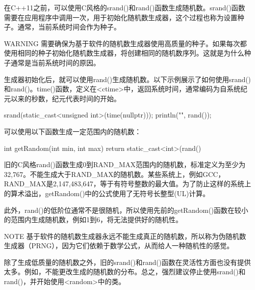 在C++11之前，可以使用C风格的srand()和rand()函数生成随机数。srand()函数需要在应用程序中调用一次，用于初始化随机数生成器，这个过程也称为设置种子。通常，当前系统时间会作为种子。

\begin{myWarning}{WARNING}
需要确保为基于软件的随机数生成器使用高质量的种子。如果每次都使用相同的种子初始化随机数生成器，将创建相同的随机数序列。这就是为什么种子通常是当前系统时间的原因。
\end{myWarning}

生成器初始化后，就可以使用rand()生成随机数。以下示例展示了如何使用srand()和rand()。time()函数，定义在<ctime>中，返回系统时间，通常编码为自系统纪元以来的秒数，纪元代表时间的开始。

\begin{cpp}
srand(static_cast<unsigned int>(time(nullptr)));
println("{}", rand());
\end{cpp}

可以使用以下函数生成一定范围内的随机数：

\begin{cpp}
int getRandom(int min, int max)
{
    return static_cast<int>(rand() %
}
\end{cpp}

旧的C风格rand()函数生成0到RAND\_MAX范围内的随机数，标准定义为至少为32,767。不能生成大于RAND\_MAX的随机数。某些系统上，例如GCC，RAND\_MAX是2,147,483,647，等于有符号整数的最大值。为了防止这样的系统上的算术溢出，getRandom()中的公式使用了无符号长整型(UL)计算。

此外，rand()的低阶位通常不是很随机，所以使用先前的getRandom()函数在较小的范围内生成随机数，例如1到6，将无法提供好的随机性。

\begin{myNotic}{NOTE}
基于软件的随机数生成器永远不能生成真正的随机数，所以称为伪随机数生成器（PRNG），因为它们依赖于数学公式，从而给人一种随机性的感觉。
\end{myNotic}

除了生成低质量的随机数之外，旧的srand()和rand()函数在灵活性方面也没有提供太多。例如，不能更改生成的随机数的分布。总之，强烈建议停止使用srand()和rand()，并开始使用<random>中的类。















